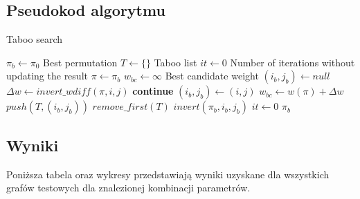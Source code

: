\documentclass[12pt]{article}
\begin{document}
    \newpage

    \subsection{Pseudokod algorytmu}

        \begin{algorithm}[h!]
            \caption{Taboo search}\label{alg:taboo_search}
            \begin{algorithmic}[1]
                    \State $\pi_b \gets \pi_0$
                        \Comment Best permutation
                    \State $T \gets \{\}$
                        \Comment Taboo list
                    \State $it \gets 0$
                        \Comment Number of iterations without updating the result
                    \State
                        \State $\pi \gets \pi_b$
                        \State $w_{bc} \gets \infty$
                            \Comment Best candidate weight
                        \State $(i_b, j_b) \gets null$
                        \State
                            \State $\Delta{w} \gets invert\_wdiff(\pi, i, j)$
                                \State \textbf{continue}
                            \EndIf
                                \State $(i_b, j_b) \gets (i, j)$
                                \State $w_{bc} \gets w(\pi) + \Delta{w}$
                            \EndIf
                        \EndFor
                        \State
                        \State $push(T, (i_b, j_b))$
                            \State $remove\_first(T)$
                        \EndIf
                        \State
                            \State $invert(\pi_b, i_b, j_b)$
                            \State $it \gets 0$
                        \EndIf
                    \EndWhile
                    \State
                    \Return $\pi_b$
                \EndProcedure
            \end{algorithmic}
            \end{algorithm}

    \newpage

    \subsection{Wyniki}
        Poniższa tabela oraz wykresy przedstawiają wyniki uzyskane dla wszystkich grafów testowych dla
        znalezionej kombinacji parametrów.
\end{document}
